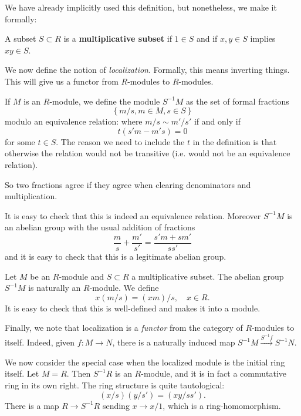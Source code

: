 We have already implicitly used this definition, but nonetheless, we make it
formally:
\begin{definition} \label{multset}
A subset $S \subset R$ is a \textbf{multiplicative subset} if $1 \in S$ and
if $x,y \in S$ implies $xy \in S$.
\end{definition} 

We now define the notion of \emph{localization}. Formally, this means inverting things.
This will give us a functor from $R$-modules to $R$-modules. 

\begin{definition} 
If $M$ is an $R$-module, we define the module $S^{-1}M$ as the set of formal
fractions
\[  \left\{m/s, m \in M, s \in S\right\}  \]
modulo an equivalence relation: where $m/s \sim m'/s'$ if and only if 
\[ t( s'm -   m's ) = 0  \]
for some $t \in S$.  The reason we need to include the $t$ in the definition is that otherwise the
 relation would not be transitive (i.e. would not be an
equivalence relation). 
\end{definition} 
So two fractions agree if they agree when clearing denominators and
multiplication.

It is easy to check that this is indeed an equivalence relation. Moreover
$S^{-1}M$ is an abelian group with the usual addition of fractions
\[ \frac{m}{s}+\frac{m'}{s'} = \frac{s'm + sm'}{ss'}  \]
and it is easy to check that this is a legitimate abelian group.

\begin{definition} 
Let $M$ be an $R$-module and $S \subset R$ a multiplicative subset.
The abelian group $S^{-1}M$ is naturally an $R$-module.  We define
\[ x(m/s) = (xm)/s, \quad x \in R.  \]
It is easy to check that this is well-defined and makes it into a module.

Finally, we note that localization is a \emph{functor} from the category of
$R$-modules to itself. Indeed, given $f: M \to N$, there is a naturally
induced map $S^{-1}M \stackrel{S^{-1}f}{\to} S^{-1}N$.

\end{definition} 

We now consider the special case when the localized module is the initial ring
itself. 
Let $M = R$.  Then $S^{-1}R$ is an $R$-module, and it is in fact a commutative
ring in its own right. The ring structure is quite tautological:
\[ (x/s)(y/s') = (xy/ss').  \]
There is a map $R \to S^{-1}R$ sending $x \to x/1$, which is a
ring-homomorphism.  


